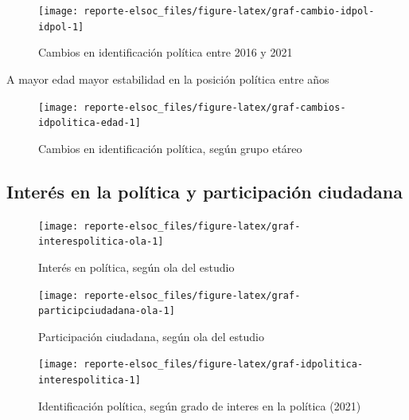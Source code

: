 \documentclass[
  12pt,
]{book}
\begin{document}
\begin{figure}

{\centering \texttt{[image: reporte-elsoc\_files/figure-latex/graf-cambio-idpol-idpol-1]} 

}

\caption{Cambios en identificación política entre 2016 y 2021}\label{fig:graf-cambio-idpol-idpol}
\end{figure}

A mayor edad mayor estabilidad en la posición política entre años

\begin{figure}

{\centering \texttt{[image: reporte-elsoc\_files/figure-latex/graf-cambios-idpolitica-edad-1]} 

}

\caption{Cambios en identificación política, según grupo etáreo}\label{fig:graf-cambios-idpolitica-edad}
\end{figure}

\hypertarget{interuxe9s-en-la-poluxedtica-y-participaciuxf3n-ciudadana}{%
\subsection{Interés en la política y participación ciudadana}\label{interuxe9s-en-la-poluxedtica-y-participaciuxf3n-ciudadana}}

\begin{figure}

{\centering \texttt{[image: reporte-elsoc\_files/figure-latex/graf-interespolitica-ola-1]} 

}

\caption{Interés en política, según ola del estudio}\label{fig:graf-interespolitica-ola}
\end{figure}

\begin{figure}

{\centering \texttt{[image: reporte-elsoc\_files/figure-latex/graf-participciudadana-ola-1]} 

}

\caption{Participación ciudadana, según ola del estudio}\label{fig:graf-participciudadana-ola}
\end{figure}

\begin{figure}

{\centering \texttt{[image: reporte-elsoc\_files/figure-latex/graf-idpolitica-interespolitica-1]} 

}

\caption{Identificación política, según grado de interes en la política (2021)}\label{fig:graf-idpolitica-interespolitica}
\end{figure}
\end{document}
